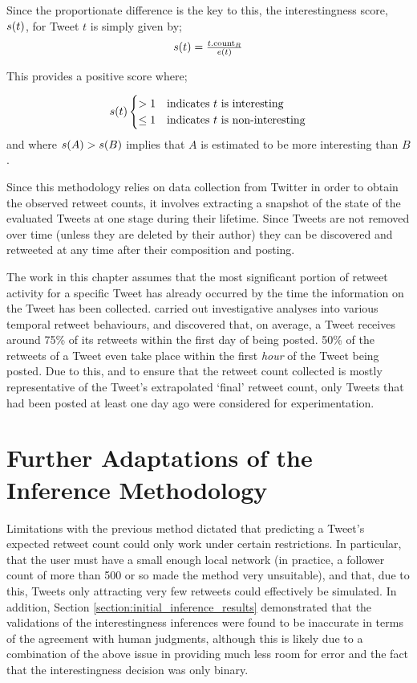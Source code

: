 Since the proportionate difference is the key to this, the interestingness score, $s(t)$, for Tweet $t$ is simply given by;
\[
\begin{array}{cc}
    s(t) = \frac{t.\textrm{count}_R}{e(t)}
\end{array}
\]

This provides a positive score where;

\[
s(t)
\begin{cases}
    > 1		&	\text{indicates } t	\text{ is interesting} \\
    \leq 1	&	\text{indicates } t	\text{ is non-interesting}
\end{cases}
\]
and where $s(A) > s(B)$ implies that $A$ is estimated to be more interesting than $B$.

Since this methodology relies on data collection from Twitter in order to obtain the observed retweet counts, it involves extracting a snapshot of the state of the evaluated Tweets at one stage during their lifetime. Since Tweets are not removed over time (unless they are deleted by their author) they can be discovered and retweeted at any time after their composition and posting.

The work in this chapter assumes that the most significant portion of retweet activity for a specific Tweet has already occurred by the time the information on the Tweet has been collected. \citet{kwak10} carried out investigative analyses into various temporal retweet behaviours, and discovered that, on average, a Tweet receives around 75\% of its retweets within the first day of being posted. 50\% of the retweets of a Tweet even take place within the first \textit{hour} of the Tweet being posted. Due to this, and to ensure that the retweet count collected is mostly representative of the Tweet's extrapolated `final' retweet count, only Tweets that had been posted at least one day ago were considered for experimentation.


\section{Further Adaptations of the Inference Methodology}
Limitations with the previous method dictated that predicting a Tweet's expected re\-tweet count could only work under certain restrictions. In particular, that the user must have a small enough local network (in practice, a follower count of more than 500 or so made the method very unsuitable), and that, due to this, Tweets only attracting very few retweets could effectively be simulated. In addition, Section \ref{section:initial_inference_results} demonstrated that the validations of the interestingness inferences were found to be inaccurate in terms of the agreement with human judgments, although this is likely due to a combination of the above issue in providing much less room for error and the fact that the interestingness decision was only binary.


